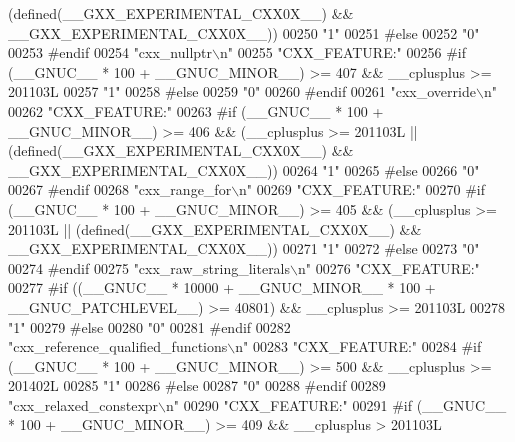 \begin{DoxyCode}
{       (defined(\_\_GXX\_EXPERIMENTAL\_CXX0X\_\_) && \_\_GXX\_EXPERIMENTAL\_CXX0X\_\_))}
00250 \textcolor{stringliteral}{"1"}
00251 \textcolor{preprocessor}{#else}
00252 \textcolor{stringliteral}{"0"}
00253 \textcolor{preprocessor}{#endif}
00254 \textcolor{stringliteral}{"cxx\_nullptr\(\backslash\)n"}
00255 \textcolor{stringliteral}{"CXX\_FEATURE:"}
00256 \textcolor{preprocessor}{#if (\_\_GNUC\_\_ * 100 + \_\_GNUC\_MINOR\_\_) >= 407 && \_\_cplusplus >= 201103L}
00257 \textcolor{stringliteral}{"1"}
00258 \textcolor{preprocessor}{#else}
00259 \textcolor{stringliteral}{"0"}
00260 \textcolor{preprocessor}{#endif}
00261 \textcolor{stringliteral}{"cxx\_override\(\backslash\)n"}
00262 \textcolor{stringliteral}{"CXX\_FEATURE:"}
00263 \textcolor{preprocessor}{#if (\_\_GNUC\_\_ * 100 + \_\_GNUC\_MINOR\_\_) >= 406 && (\_\_cplusplus >= 201103L ||
       (defined(\_\_GXX\_EXPERIMENTAL\_CXX0X\_\_) && \_\_GXX\_EXPERIMENTAL\_CXX0X\_\_))}
00264 \textcolor{stringliteral}{"1"}
00265 \textcolor{preprocessor}{#else}
00266 \textcolor{stringliteral}{"0"}
00267 \textcolor{preprocessor}{#endif}
00268 \textcolor{stringliteral}{"cxx\_range\_for\(\backslash\)n"}
00269 \textcolor{stringliteral}{"CXX\_FEATURE:"}
00270 \textcolor{preprocessor}{#if (\_\_GNUC\_\_ * 100 + \_\_GNUC\_MINOR\_\_) >= 405 && (\_\_cplusplus >= 201103L ||
       (defined(\_\_GXX\_EXPERIMENTAL\_CXX0X\_\_) && \_\_GXX\_EXPERIMENTAL\_CXX0X\_\_))}
00271 \textcolor{stringliteral}{"1"}
00272 \textcolor{preprocessor}{#else}
00273 \textcolor{stringliteral}{"0"}
00274 \textcolor{preprocessor}{#endif}
00275 \textcolor{stringliteral}{"cxx\_raw\_string\_literals\(\backslash\)n"}
00276 \textcolor{stringliteral}{"CXX\_FEATURE:"}
00277 \textcolor{preprocessor}{#if ((\_\_GNUC\_\_ * 10000 + \_\_GNUC\_MINOR\_\_ * 100 + \_\_GNUC\_PATCHLEVEL\_\_) >= 40801) && \_\_cplusplus >= 201103L}
00278 \textcolor{stringliteral}{"1"}
00279 \textcolor{preprocessor}{#else}
00280 \textcolor{stringliteral}{"0"}
00281 \textcolor{preprocessor}{#endif}
00282 \textcolor{stringliteral}{"cxx\_reference\_qualified\_functions\(\backslash\)n"}
00283 \textcolor{stringliteral}{"CXX\_FEATURE:"}
00284 \textcolor{preprocessor}{#if (\_\_GNUC\_\_ * 100 + \_\_GNUC\_MINOR\_\_) >= 500 && \_\_cplusplus >= 201402L}
00285 \textcolor{stringliteral}{"1"}
00286 \textcolor{preprocessor}{#else}
00287 \textcolor{stringliteral}{"0"}
00288 \textcolor{preprocessor}{#endif}
00289 \textcolor{stringliteral}{"cxx\_relaxed\_constexpr\(\backslash\)n"}
00290 \textcolor{stringliteral}{"CXX\_FEATURE:"}
00291 \textcolor{preprocessor}{#if (\_\_GNUC\_\_ * 100 + \_\_GNUC\_MINOR\_\_) >= 409 && \_\_cplusplus > 201103L}

\end{DoxyCode}
